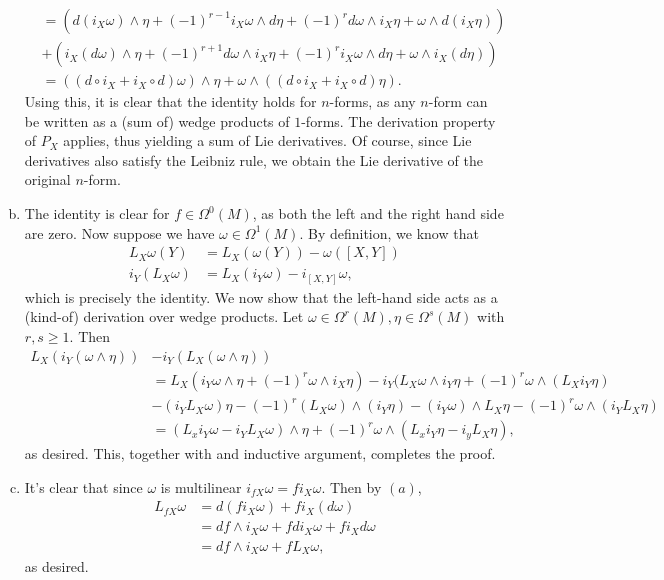 \documentclass{../mathnotes}
\begin{document}
\begin{enumerate}[(a)]
\begin{align*}
            &=\left( d(i_X\omega)\wedge\eta+(-1)^{r-1}i_X\omega\wedge d\eta+(-1)^rd\omega\wedge i_X\eta+\omega\wedge d(i_X\eta) \right)\\
            &+\left( i_X(d\omega)\wedge\eta+(-1)^{r+1}d\omega\wedge i_X\eta+(-1)^ri_X\omega\wedge d\eta+\omega\wedge i_X(d\eta) \right)\\
            &=((d\circ i_X+i_X\circ d)\omega)\wedge\eta+\omega\wedge ( (d\circ i_X+i_X\circ d)\eta ).
        \end{align*}
        Using this, it is clear that the identity holds for $n$-forms, as any $n$-form can be
        written as a (sum of) wedge products of $1$-forms. The derivation property of $P_X$ applies,
        thus yielding a sum of Lie derivatives. Of course, since Lie derivatives also satisfy the Leibniz rule,
        we obtain the Lie derivative of the original $n$-form.
    \item The identity is clear for $f\in\Omega^0(M)$, as both the left and the right hand side are zero.
        Now suppose we have $\omega\in\Omega^1(M)$. By definition, we know that
        \begin{align*}
            L_X\omega(Y) &= L_X(\omega(Y)) -\omega([X,Y])\\
            i_Y(L_X\omega) &= L_X(i_Y\omega)-i_{[X,Y]}\omega,
        \end{align*}
        which is precisely the identity.
        We now show that the left-hand side acts as a (kind-of) derivation over wedge products. Let
        $\omega\in\Omega^r(M),\eta\in\Omega^s(M)$ with $r,s\geq 1$. Then
        \begin{align*}
            L_X(i_Y(\omega\wedge\eta))&-i_Y(L_X(\omega\wedge\eta))\\
            &=L_X(i_Y\omega\wedge\eta+(-1)^r\omega\wedge i_X\eta)-i_Y(L_X\omega\wedge i_Y\eta+(-1)^r\omega\wedge(L_Xi_Y\eta)\\
            &-(i_YL_X\omega)\eta-(-1)^r(L_X\omega)\wedge(i_Y\eta)-(i_Y\omega)\wedge L_X\eta-(-1)^r\omega\wedge(i_YL_X\eta)\\
            &=(L_xi_Y\omega-i_YL_X\omega)\wedge\eta+(-1)^r\omega\wedge(L_xi_Y\eta-i_yL_X\eta),
        \end{align*}
        as desired. This, together with and inductive argument, completes the proof.
    \item It's clear that since $\omega$ is multilinear $i_{fX}\omega=fi_X\omega$. Then by $(a)$,
        \begin{align*}
            L_{fX}\omega &= d(fi_X\omega)+fi_X(d\omega)\\
            &= df\wedge i_X\omega+fdi_X\omega+fi_Xd\omega\\
            &= df\wedge i_X\omega+fL_X\omega,
        \end{align*}
        as desired.
\end{enumerate}
\end{document}
